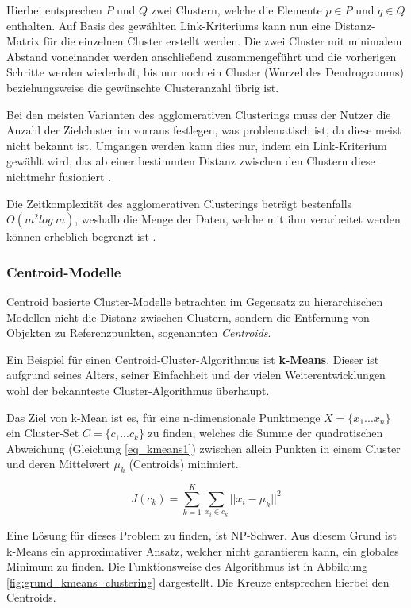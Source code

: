 Hierbei entsprechen $P$ und $Q$ zwei Clustern, welche die Elemente $p \in P$ und $q \in Q$ enthalten.
Auf Basis des gewählten Link-Kriteriums kann nun eine Distanz-Matrix für die einzelnen Cluster
erstellt werden.
Die zwei Cluster mit minimalem Abstand voneinander werden anschließend zusammengeführt und die
vorherigen Schritte werden wiederholt, bis nur noch ein Cluster (Wurzel des Dendrogramms) beziehungsweise
die gewünschte Clusteranzahl übrig ist. \cite[]{GeorgeSeif2018, tan2007introduction}

Bei den meisten Varianten des agglomerativen Clusterings muss der Nutzer die Anzahl der Zielcluster im
vorraus festlegen, was problematisch ist, da diese meist nicht bekannt ist. Umgangen werden kann dies nur,
indem ein Link-Kriterium gewählt wird, das ab einer bestimmten Distanz zwischen den Clustern diese nichtmehr
fusioniert \cite[]{GeorgeSeif2018}.

Die Zeitkomplexität des agglomerativen Clusterings beträgt bestenfalls $O(m^2log\ m)$, weshalb die Menge der Daten,
welche mit ihm verarbeitet werden können erheblich begrenzt ist \cite[]{tan2007introduction}.

\subsubsection{Centroid-Modelle}

Centroid basierte Cluster-Modelle betrachten im Gegensatz zu hierarchischen Modellen nicht die Distanz
zwischen Clustern, sondern die Entfernung von Objekten zu Referenzpunkten, sogenannten \textit{Centroids}.

Ein Beispiel für einen Centroid-Cluster-Algorithmus ist \textbf{k-Means}. Dieser ist aufgrund seines Alters,
seiner Einfachheit und der vielen Weiterentwicklungen wohl der bekannteste Cluster-Algorithmus überhaupt.

Das Ziel von k-Mean ist es, für eine n-dimensionale Punktmenge $X = \{ x_1 ... x_n \}$ ein Cluster-Set $C = \{ c_1 ... c_k \}$
zu finden, welches die Summe der quadratischen Abweichung (Gleichung \ref{eq_kmeans1}) zwischen allein Punkten in einem Cluster und deren
Mittelwert $\mu_k$ (Centroids) minimiert.

\begin{equation}
    \label{eq_kmeans1}
    J(c_k) = \sum_{k=1}^K \sum_{x_i \in c_k} || x_i - \mu_k ||^2
\end{equation}

Eine Lösung für dieses Problem zu finden, ist NP-Schwer. Aus diesem Grund
ist k-Means ein approximativer Ansatz, welcher nicht garantieren kann, ein globales Minimum zu finden.
Die Funktionsweise des Algorithmus ist in Abbildung \ref{fig:grund_kmeans_clustering} dargestellt.
Die Kreuze entsprechen hierbei den Centroids.

